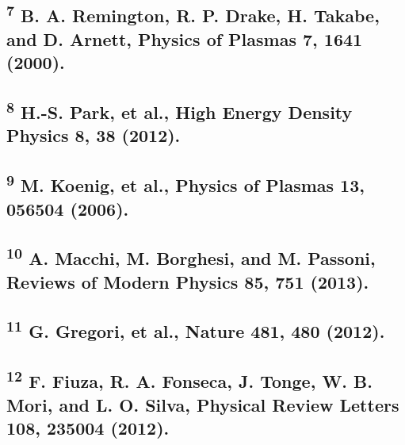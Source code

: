 \subsection{\texorpdfstring{\textsuperscript{7} B. A. Remington, R. P.
Drake, H. Takabe, and D. Arnett, Physics of Plasmas 7, 1641
(2000).}{7 B. A. Remington, R. P. Drake, H. Takabe, and D. Arnett, Physics of Plasmas 7, 1641 (2000).}}\label{b.-a.-remington-r.-p.-drake-h.-takabe-and-d.-arnett-physics-of-plasmas-7-1641-2000.}

\subsection{\texorpdfstring{\textsuperscript{8} H.-S. Park, et al., High
Energy Density Physics 8, 38
(2012).}{8 H.-S. Park, et al., High Energy Density Physics 8, 38 (2012).}}\label{h.-s.-park-et-al.-high-energy-density-physics-8-38-2012.}

\subsection{\texorpdfstring{\textsuperscript{9} M. Koenig, et al.,
Physics of Plasmas 13, 056504
(2006).}{9 M. Koenig, et al., Physics of Plasmas 13, 056504 (2006).}}\label{m.-koenig-et-al.-physics-of-plasmas-13-056504-2006.}

\subsection{\texorpdfstring{\textsuperscript{10} A. Macchi, M. Borghesi,
and M. Passoni, Reviews of Modern Physics 85, 751
(2013).}{10 A. Macchi, M. Borghesi, and M. Passoni, Reviews of Modern Physics 85, 751 (2013).}}\label{a.-macchi-m.-borghesi-and-m.-passoni-reviews-of-modern-physics-85-751-2013.}

\subsection{\texorpdfstring{\textsuperscript{11} G. Gregori, et al.,
Nature 481, 480
(2012).}{11 G. Gregori, et al., Nature 481, 480 (2012).}}\label{g.-gregori-et-al.-nature-481-480-2012.}

\subsection{\texorpdfstring{\textsuperscript{12} F. Fiuza, R. A.
Fonseca, J. Tonge, W. B. Mori, and L. O. Silva, Physical Review Letters
108, 235004
(2012).}{12 F. Fiuza, R. A. Fonseca, J. Tonge, W. B. Mori, and L. O. Silva, Physical Review Letters 108, 235004 (2012).}}\label{f.-fiuza-r.-a.-fonseca-j.-tonge-w.-b.-mori-and-l.-o.-silva-physical-review-letters-108-235004-2012.}


